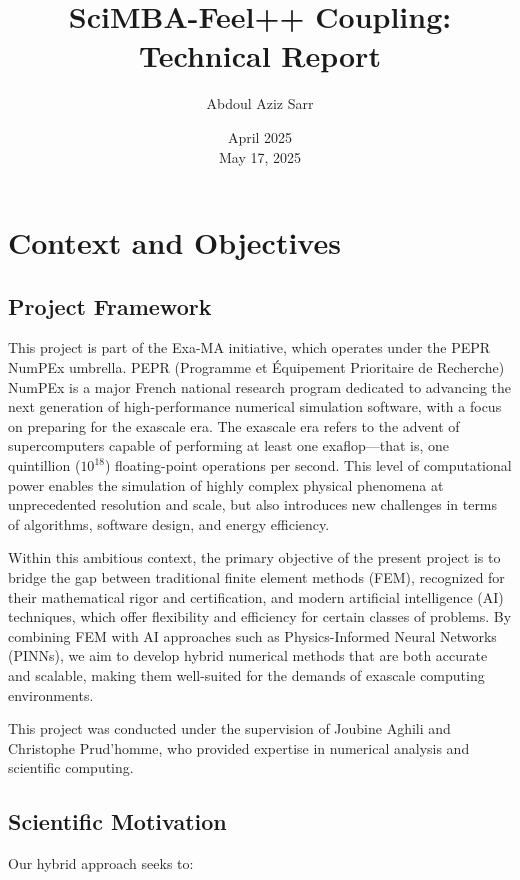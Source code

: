 \documentclass[12pt]{article}
\title{SciMBA-Feel++ Coupling: Technical Report}
\author{Abdoul Aziz Sarr}
\date{April 2025 \\ May 17, 2025}
\begin{document}
\maketitle

\tableofcontents
\newpage
\section{Context and Objectives}

\subsection{Project Framework}

This project is part of the Exa-MA initiative, which operates under the PEPR NumPEx umbrella. PEPR (Programme et Équipement Prioritaire de Recherche) NumPEx is a major French national research program dedicated to advancing the next generation of high-performance numerical simulation software, with a focus on preparing for the exascale era. The exascale era refers to the advent of supercomputers capable of performing at least one exaflop—that is, one quintillion ($10^{18}$) floating-point operations per second. This level of computational power enables the simulation of highly complex physical phenomena at unprecedented resolution and scale, but also introduces new challenges in terms of algorithms, software design, and energy efficiency.

Within this ambitious context, the primary objective of the present project is to bridge the gap between traditional finite element methods (FEM), recognized for their mathematical rigor and certification, and modern artificial intelligence (AI) techniques, which offer flexibility and efficiency for certain classes of problems. By combining FEM with AI approaches such as Physics-Informed Neural Networks (PINNs), we aim to develop hybrid numerical methods that are both accurate and scalable, making them well-suited for the demands of exascale computing environments.

This project was conducted under the supervision of Joubine Aghili and Christophe Prud’homme, who provided expertise in numerical analysis and scientific computing.




\subsection{Scientific Motivation}

Our hybrid approach seeks to:
\end{document}
